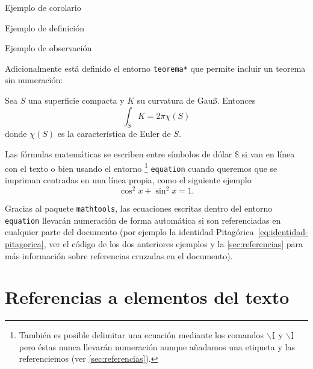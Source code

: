 \begin{corolario}
Ejemplo de corolario
\end{corolario}

\begin{definicion}
Ejemplo de definición
\end{definicion}

\begin{observacion}
Ejemplo de observación
\end{observacion}

Adicionalmente está definido el entorno \texttt{teorema*} que permite incluir un teorema sin numeración:

\begin{teorema*}
  Sea $S$ una superficie compacta y $K$ su curvatura de Gauß. Entonces
\begin{equation}
  \int_S K = 2\pi\chi(S)
\end{equation}
donde $\chi(S)$ es la característica de Euler de $S$.
\end{teorema*}

Las fórmulas matemáticas se escriben entre símbolos de dólar \$ si van en línea con el texto o bien usando el entorno%
\footnote{
  También es posible delimitar una ecuación mediante los comandos \texttt{$\backslash$[} y \texttt{$\backslash$]} pero éstas nunca llevarán numeración aunque añadamos una etiqueta y las referenciemos (ver \autoref{sec:referencias}).
} 
\texttt{equation} cuando queremos que se impriman centradas en una línea propia, como el siguiente ejemplo
\begin{equation}\label{eq:identidad-pitagorica}
  \cos^2 x + \sin^2 x = 1.
\end{equation}


Gracias al paquete \texttt{mathtools}, las ecuaciones escritas dentro del entorno \texttt{equation} llevarán numeración de forma automática si son referenciadas  en cualquier parte del documento (por ejemplo la identidad Pitagórica~\eqref{eq:identidad-pitagorica}, ver el código de los dos anteriores ejemplos y la \autoref{sec:referencias} para más información sobre referencias cruzadas en el documento).




\section{Referencias a elementos del texto}\label{sec:referencias}

